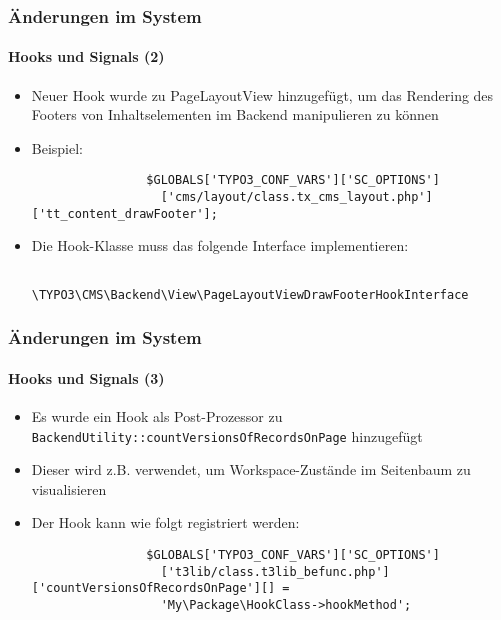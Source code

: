 \begin{frame}[fragile]
	\frametitle{Änderungen im System}
	\framesubtitle{Hooks und Signals (2)}

	\begin{itemize}

		\item Neuer Hook wurde zu PageLayoutView hinzugefügt, um das
			Rendering des Footers von Inhaltselementen im Backend
			manipulieren zu können

		\item Beispiel:
			\begin{lstlisting}
				$GLOBALS['TYPO3_CONF_VARS']['SC_OPTIONS']
				  ['cms/layout/class.tx_cms_layout.php']['tt_content_drawFooter'];
			\end{lstlisting}

		\item Die Hook-Klasse muss das folgende Interface implementieren:
			\begin{lstlisting}
				\TYPO3\CMS\Backend\View\PageLayoutViewDrawFooterHookInterface
			\end{lstlisting}

	\end{itemize}

\end{frame}


\begin{frame}[fragile]
	\frametitle{Änderungen im System}
	\framesubtitle{Hooks und Signals (3)}

	\begin{itemize}

		\item Es wurde ein Hook als Post-Prozessor zu
			\small
				\texttt{BackendUtility::countVersionsOfRecordsOnPage}
			\normalsize
			hinzugefügt

		\item Dieser wird z.B. verwendet, um Workspace-Zustände im Seitenbaum zu visualisieren
		\item Der Hook kann wie folgt registriert werden:

			\begin{lstlisting}
				$GLOBALS['TYPO3_CONF_VARS']['SC_OPTIONS']
				  ['t3lib/class.t3lib_befunc.php']['countVersionsOfRecordsOnPage'][] =
				  'My\Package\HookClass->hookMethod';
			\end{lstlisting}

	\end{itemize}

\end{frame}

